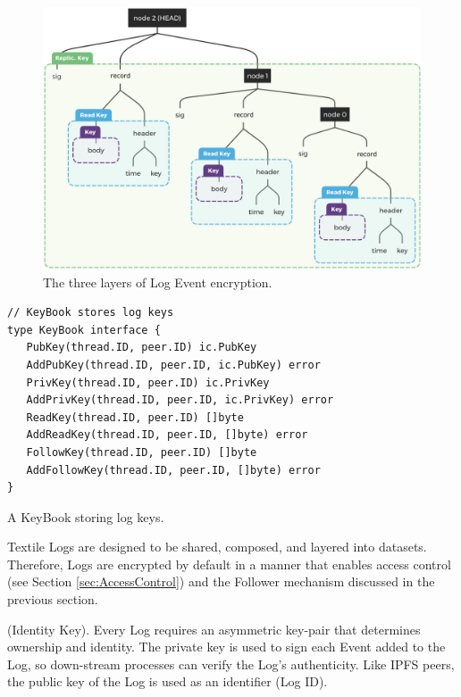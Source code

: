 \documentclass{comjnl}
\begin{document}
\begin{figure}
\centering
\begin{minipage}{0.6\textwidth}
  \includegraphics[width=\linewidth]{figures/Event_Log_With_Encryption.png}
  \caption{The three layers of Log Event encryption.}
  \label{fig:LogEncryption}
  \end{minipage}
\end{figure}

\begin{example}
\begin{lstlisting}
// KeyBook stores log keys
type KeyBook interface {
   PubKey(thread.ID, peer.ID) ic.PubKey
   AddPubKey(thread.ID, peer.ID, ic.PubKey) error
   PrivKey(thread.ID, peer.ID) ic.PrivKey
   AddPrivKey(thread.ID, peer.ID, ic.PrivKey) error
   ReadKey(thread.ID, peer.ID) []byte
   AddReadKey(thread.ID, peer.ID, []byte) error
   FollowKey(thread.ID, peer.ID) []byte
   AddFollowKey(thread.ID, peer.ID, []byte) error
}
\end{lstlisting}
\caption{A KeyBook storing log keys.}
\end{example} \label{ex:KeyBook}


Textile Logs are designed to be shared, composed, and layered into datasets. Therefore, Logs are encrypted by default in a manner that enables access control (see Section  \ref{sec:AccessControl}) and the Follower mechanism discussed in the previous section.

\begin{definition}
(Identity Key). Every Log requires an asymmetric key-pair that determines ownership and identity. The private key is used to sign each Event added to the Log, so down-stream processes can verify the Log’s authenticity. Like IPFS peers, the public key of the Log is used as an identifier (Log ID).
\end{definition}
\end{document}
